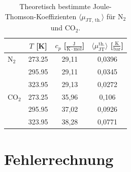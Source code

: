 \documentclass[a4paper,12pt,oneside,onecolum,final,openany]{report}
\begin{document}
\begin{table} [h]
\centering
\caption{Theoretisch bestimmte Joule-Thomson-Koeffizienten $\langle \mu_{\text{JT, th.}} \rangle$ für $\text{N}_2$  und $\mathrm{CO}_2$.}
\begin{tabular} {l | c|  c | c}
	 &  $T$ [K] &  $c_p$ [$\frac{\mathrm{J}}{\mathrm{K}\cdot \mathrm{mol}}$] & $ \langle\mu_{\text{JT}}^{\text{th.}}\rangle$ [$\frac{\mathrm{K}}{\mathrm{bar}}$] \\
	 \hline
	  $\text{N}_\mathrm{2}$ & 273.25 & 29,11 & 0,0396\\
	   & 295.95 & 29,11 & 0,0345\\
	  & 323.95 & 29,13 & 0,0272 \\
	\hline
	$\mathrm{CO}_2$ & 273.25& 35,96&0,106  \\
	& 295.95 & 37,02& 0,0926\\
	& 323.95& 38,28& 0,0771\\
\end{tabular}
\end{table}
\FloatBarrier


\section{Fehlerrechnung}
\end{document}
